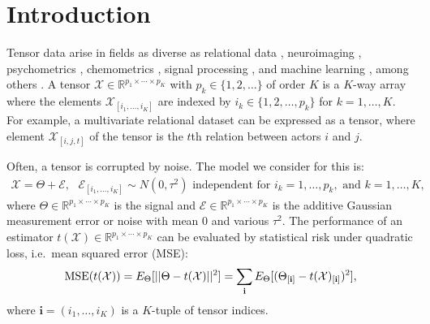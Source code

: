 \section{Introduction}
\label{sec:intro}

Tensor data arise in fields as diverse as relational data
\citep{hoff2015multilinear}, neuroimaging
\citep{zhang2014tensor,li2016parsimonious}, psychometrics
\citep{kiers2001three}, chemometrics
\citep{smilde2005multi,bro2006review}, signal processing
\citep{cichocki2015tensor}, and machine learning
\citep{tao2005supervised}, among others
\citep{kroonenberg2008applied}.
A tensor $\mathcal{X} \in \mathbb{R}^{p_1\times\cdots\times p_K}$ with
$p_k \in \{1,2,\ldots\}$ of order $K$ is a $K$-way array where the
elements $\mathcal{X}_{[i_1,\ldots,i_K]}$ are indexed by $i_k \in
\{1,2,\ldots,p_k\}$ for $k = 1,\ldots,K$. For example, a multivariate
relational dataset can be expressed as a tensor, where element
$\mathcal{X}_{[i,j,t]}$ of the tensor is the $t$th relation between
actors $i$ and $j$.

Often, a tensor is corrupted by noise. The model we consider for this
is:
\begin{align}
  \label{equation:normal.model}
  \mathcal{X} = \Theta + \mathcal{E},\text{  } \mathcal{E}_{[i_1,\ldots,i_K]} \sim N(0,\tau^2) \text{ independent for } i_k = 1,\ldots,p_k, \text{ and } k = 1,\ldots,K,
\end{align}
where $\Theta \in \mathbb{R}^{p_1\times\cdots\times p_K}$ is the
signal and $\mathcal{E} \in \mathbb{R}^{p_1\times\cdots\times p_K}$ is
the additive Gaussian measurement error or noise with mean 0 and
various $\tau^2$. The performance of an estimator
$t(\mathcal{X})\in \mathbb{R}^{p_1\times\cdots\times p_K}$ can be
evaluated by statistical risk under quadratic loss, i.e.\ mean squared
error (MSE):
\begin{align}
  \label{equation:mse}
  \operatorname*{MSE}(t(\mathcal{X})) = E_{\Theta}[||\Theta - t(\mathcal{X})||^2] = \sum_{\mathbf{i}} E_{\Theta}[(\Theta_{[\mathbf{i}]} - t(\mathcal{X})_{[\mathbf{i}]})^2],
\end{align}
where $\mathbf{i} = (i_1,\ldots,i_K)$ is a $K$-tuple of tensor
indices.

